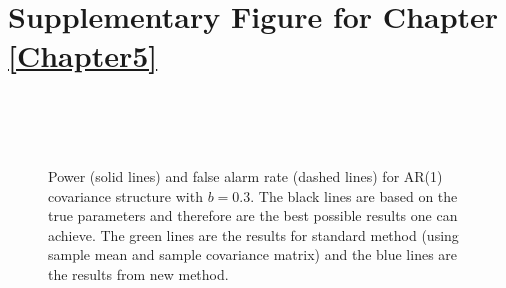 
\chapter{Supplementary Figure for Chapter \ref{Chapter5}} %

\label{AppendixB} %




\begin{figure}[htp]
\centering

\\
\\
\\
\caption{Power (solid lines) and false alarm rate (dashed lines) for AR(1) covariance structure with $b=0.3$. The black lines are based on the true parameters and therefore are the best possible results one can achieve. The green lines are the results for standard method (using sample mean and sample covariance matrix) and the blue lines are the results from new method. \label{sup.1}}        
\end{figure}



